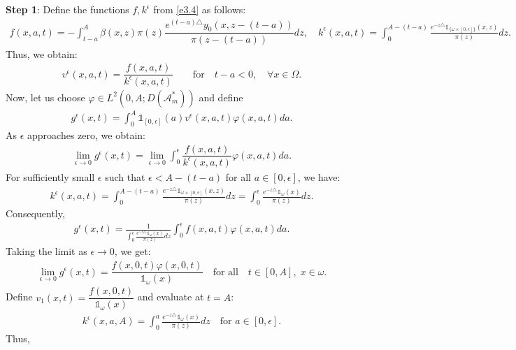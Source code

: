 \documentclass[10pt, a4]{amsart}
\makeatletter
\theoremstyle{plain}
\theoremstyle{definition}
\theoremstyle{remark}
\renewenvironment{proof}[1][\proofname]{\par
  \pushQED{\qed}%
  \normalfont \topsep6\p@\@plus6\p@\relax
  \trivlist
  \item[\hskip\labelsep
        \itshape
    #1\ \ref{#1}.]\ignorespaces
}{%
  \popQED\endtrivlist\@endpefalse
}
\numberwithin{equation}{section}
\def\to{\rightarrow}
\makeatother
\begin{document}
\begin{proof}[of Theorem \ref{th1.4}]
{\bf Step 1}: Define the functions \( f, k^{\epsilon} \) from \eqref{e3.4} as follows:
\begin{align}\label{eq2.57}
f(x,a,t)=-\int_{t-a}^A \beta(x,z)\pi(z) \dfrac{e^{(t-a)\triangle}y_{0}(x,z-(t-a))}{\pi(z-(t-a))}dz, \quad k^{\epsilon}(x,a,t)=\int_{0}^{A-(t-a)}\frac{e^{-z\triangle}\mathds{1}_{\lbrace\omega\times[0,\epsilon]\rbrace}(x,z)}{\pi(z)}dz.
\end{align} 
Thus, we obtain:
\begin{align*}
v^{\epsilon}(x,a,t)=\dfrac{f(x,a,t)}{k^{\epsilon}(x,a,t)} \qquad \text{for} \quad t-a<0, \quad \forall x\in \Omega.
\end{align*}
Now, let us choose \( \varphi \in L^2 (0,A; D(\mathcal{A}^{\ast}_m)) \) and define
\begin{align}
g^{\epsilon}(x,t) = \int_0^A \mathds{1}_{[0,\epsilon]}(a) v^{\epsilon}(x,a,t)\varphi(x,a,t)da.
\end{align}
As \( \epsilon \) approaches zero, we obtain:
\begin{align}
    \lim_{\epsilon\to 0} g^{\epsilon}(x,t)=\lim_{\epsilon\to 0}\int_0^\epsilon \dfrac{f(x,a,t)}{k^{\epsilon}(x,a,t)}\varphi(x,a,t)da.
\end{align}
For sufficiently small \( \epsilon \) such that \( \epsilon<A-(t-a) \) for all \( a\in [0,\epsilon] \), we have:
\begin{align}\label{eq2.60}
k^{\epsilon}(x,a,t)=\int_{0}^{A-(t-a)}\frac{e^{-z\triangle}\mathds{1}_{\omega\times[0,\epsilon]}(x,z)}{\pi(z)}dz =\int_{0}^{\epsilon}\frac{e^{-z\triangle}\mathds{1}_{\omega}(x)}{\pi(z)}dz.
\end{align}
Consequently,
\begin{align*}
g^{\epsilon}(x,t)= \frac{1}{\displaystyle\int_{0}^{\epsilon}\frac{e^{-z\triangle}\mathds{1}_{\omega}(x)}{\pi(z)}dz} \int_0^\epsilon f(x,a,t)\varphi(x,a,t)da.
\end{align*}
Taking the limit as \( \epsilon \to 0 \), we get:
\begin{align*}
    \lim_{\epsilon\to 0} g^{\epsilon}(x,t)=\dfrac{f(x,0,t)\varphi(x,0,t)}{\mathds{1}_{\omega}(x)}\quad\text{for all}\quad t\in [0,A],\;  x\in \omega.
\end{align*}
Define \( v_1 (x,t)=\dfrac{f(x,0,t)}{\mathds{1}_{\omega}(x)} \) and evaluate at \( t=A \):
\begin{align*}
k^{\epsilon}(x,a,A) =\int_{0}^{a}\frac{e^{-z\triangle}\mathds{1}_{\omega}(x)}{\pi(z)}dz\quad \text{for } a\in [0,\epsilon].
\end{align*}
Thus,
\begin{align*}

\end{align*}
\end{proof}
\end{document}
